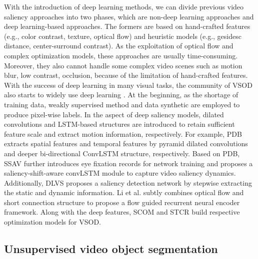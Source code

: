 \documentclass[12pt]{article}
\begin{document}
With the introduction of deep learning methods, we can divide previous video saliency approaches into two phases, which are non-deep learning approaches and deep learning-based approaches. The formers are based on hand-crafted features (e.g., color contrast, texture, optical flow) and heuristic models (e.g., gesidesc distance, center-surround contrast). As the exploitation of optical flow and complex optimization models, these approaches are usually time-consuming. Moreover, they also cannot handle some complex video scenes such as motion blur, low contrast, occlusion, because of the limitation of hand-crafted features. With the success of deep learning in many visual tasks, the community of VSOD also starts to widely use deep learning \cite{A,B,C,D,F}. At the beginning, as the shortage of training data, weakly supervised method \cite{scnn} and data synthetic \cite{fcn} are employed to produce pixel-wise labels. In the aspect of deep saliency models, dilated convolutions and LSTM-based structures are introduced to retain sufficient feature scale and extract motion information, respectively. For example, PDB \cite{pdb} extracts spatial features and temporal features by pyramid dilated convolutions and deeper bi-directional ConvLSTM structure, respectively. Based on PDB, SSAV \cite{ssav} further introduces eye fixation records for network training and proposes a saliency-shift-aware convLSTM module to capture video saliency dynamics. Additionally, DLVS \cite{scnn} proposes a saliency detection network by stepwise extracting the static and dynamic information. Li et al. \cite{fgrne} subtly combines optical flow and short connection structure \cite{dss} to propose a flow guided recurrent neural encoder framework. Along with the deep features, SCOM \cite{scom} and STCR \cite{scom} build respective optimization models for VSOD. 

\subsection{Unsupervised video object segmentation}
\end{document}
